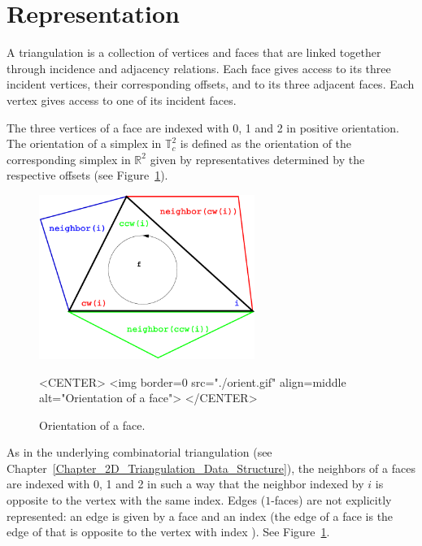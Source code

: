 \section{Representation\label{P2Triangulation2-sec-intro}}

A triangulation is a collection of vertices and faces that are linked
together through incidence and adjacency relations. Each face gives
access to its three incident vertices, their corresponding offsets, and
to its three adjacent faces. Each vertex gives access to one of its
incident faces.

The three vertices of a face are indexed with 0, 1 and 2 in positive
orientation. The orientation of a simplex in $\mathbb T_c^2$ is
defined as the orientation of the corresponding simplex in $\mathbb
R^2$ given by representatives determined by the respective offsets
(see Figure~\ref{P2Triangulation2-fig-orient}).

\begin{figure}[htbp]
\begin{ccTexOnly}
\begin{center} 
\includegraphics[width=7cm]{Periodic_2_triangulation_2/orient} 
\end{center}
\end{ccTexOnly}
\begin{ccHtmlOnly}
<CENTER>
<img border=0 src="./orient.gif" align=middle alt="Orientation of a face">
</CENTER>
\end{ccHtmlOnly}
\caption{Orientation of a face.
\label{P2Triangulation2-fig-orient}}
\end{figure} 

As in the underlying combinatorial triangulation (see
Chapter~\ref{Chapter_2D_Triangulation_Data_Structure}), the neighbors
of a faces are indexed with 0, 1 and 2 in such a way that the neighbor
indexed by $i$ is opposite to the vertex with the same index. Edges
($1$-faces) are not explicitly represented: an edge is given by a face
and an index (the edge  of a face  is the edge of
 that is opposite to the vertex with index ).  See
Figure~\ref{P2Triangulation2-fig-orient}.

